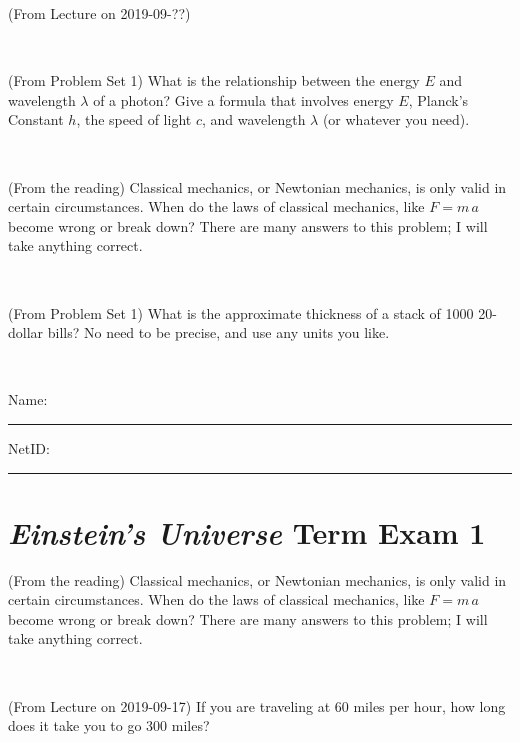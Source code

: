\documentclass[12pt, letterpaper]{article}
\begin{document}
\begin{problem} (From Lecture on 2019-09-??)
\end{problem}


\vfill ~

\begin{problem} (From Problem Set 1)
What is the relationship between the energy $E$ and wavelength
$\lambda$ of a photon? Give a formula that involves energy $E$,
Planck's Constant $h$, the speed of light $c$, and wavelength
$\lambda$ (or whatever you need).
\end{problem}

\vfill ~

\begin{problem} (From the reading)
Classical mechanics, or Newtonian mechanics, is only valid in certain
circumstances. When do the laws of classical mechanics, like $F =
m\,a$ become wrong or break down? There are many answers to this
problem; I will take anything correct.
\end{problem}


\vfill ~

\begin{problem} (From Problem Set 1)
What is the approximate thickness of a stack of 1000 20-dollar bills?
No need to be precise, and use any units you like.
\end{problem}


\vfill ~


\cleardoublepage



\noindent
Name: \rule[-1ex]{0.60\textwidth}{0.1pt}
NetID: \rule[-1ex]{0.20\textwidth}{0.1pt}

\section*{\textsl{Einstein's Universe} Term Exam 1}
\setcounter{problem}{1}


\begin{problem} (From the reading)
Classical mechanics, or Newtonian mechanics, is only valid in certain
circumstances. When do the laws of classical mechanics, like $F =
m\,a$ become wrong or break down? There are many answers to this
problem; I will take anything correct.
\end{problem}


\vfill ~

\begin{problem} (From Lecture on 2019-09-17)
If you are traveling at 60 miles per hour, how long does
it take you to go 300 miles?
\end{problem}
\end{document}
